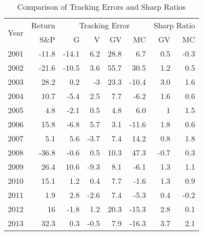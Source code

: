 \documentclass{article}
\begin{document}
\newpage
\begin{table}[!ht]
    \centering
    \caption{Comparison of Tracking Errors and Sharp Ratios}
    \medskip

\begin{tabular}{ c | r || rr || rr || rr}
\hline
\multirow{2}{*}{Year} & \multicolumn{1}{c||}{Return}   & \multicolumn{4}{c||}{Tracking Error} 
& \multicolumn{2}{c}{Sharp Ratio}   \\ \cline{2-8}
  & S\&P & G & V  & GV  & MC  & GV  & MC  \\ 
\hline
              2001 & -11.8 & -14.1 & \cellcolor{green!25}6.2 & \cellcolor{green!25}28.8 & 6.7 & \cellcolor{green!25}0.5 & -0.3 \\ 
        2002 & -21.6 & -10.5 & \cellcolor{green!25}3.6 & \cellcolor{green!25}55.7 & 30.5 & \cellcolor{green!25}1.2 & 0.5 \\ 
        2003 & 28.2 & \cellcolor{green!25}0.2 & -3 & \cellcolor{green!25}23.3 & -10.4 & \cellcolor{green!25}3.0 & 1.6 \\ 
        2004 & 10.7 & -5.4 & \cellcolor{green!25}2.5 & \cellcolor{green!25}7.7 & -6.2 & \cellcolor{green!25}1.6 & 0.6 \\ 
        2005 & 4.8 & -2.1 & \cellcolor{green!25}0.5 & 4.8 & \cellcolor{green!25}6.0 & 1 & \cellcolor{green!25}1.5 \\ 
        2006 & 15.8 & -6.8 & \cellcolor{green!25}5.7 & \cellcolor{green!25}3.1 & -11.6 & \cellcolor{green!25}1.8 & 0.6 \\ 
        2007 & 5.1 & \cellcolor{green!25}5.6 & -3.7 & 7.4 & \cellcolor{green!25}14.2 & 0.8 & \cellcolor{green!25}1.8 \\ 
        2008 & -36.8 & -0.6 & \cellcolor{green!25}0.5 & 10.3 & \cellcolor{green!25}47.3 & -0.7 & \cellcolor{green!25}0.3 \\ 
        2009 & 26.4 & \cellcolor{green!25}10.6 & -9.3 & \cellcolor{green!25}8.1 & -6.1 & \cellcolor{green!25}1.3 & 1.1 \\ 
        2010 & 15.1 & \cellcolor{green!25}1.2 & 0.4 & \cellcolor{green!25}7.7 & -1.6 & \cellcolor{green!25}1.3 & 0.9 \\ 
        2011 & 1.9 & \cellcolor{green!25}2.8 & -2.6 & \cellcolor{green!25}7.4 & -5.3 & \cellcolor{green!25}0.4 & -0.2 \\ 
        2012 & 16 & -1.8 & \cellcolor{green!25}1.2 & \cellcolor{green!25}20.3 & -15.3 & \cellcolor{green!25}2.8 & 0.1 \\ 
        2013 & 32.3 & \cellcolor{green!25}0.3 & -0.5 & \cellcolor{green!25}7.9 & -16.3 & \cellcolor{green!25}3.7 & 2.1 \\ 

\end{tabular}
\end{table}
\end{document}
